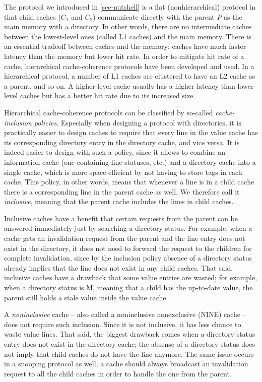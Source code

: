 The protocol we introduced in \autoref{sec-nutshell} is a flat (nonhierarchical) protocol in that child caches ($C_1$ and $C_2$) communicate directly with the parent $P$ as the main memory with a directory.
In other words, there are no intermediate caches between the lowest-level ones (called L1 caches) and the main memory.
There is an essential tradeoff between caches and the memory: caches have much faster latency than the memory but lower hit rate.
In order to mitigate hit rate of a cache, hierarchical cache-coherence protocols have been developed and used.
In a hierarchical protocol, a number of L1 caches are clustered to have an L2 cache as a parent, and so on.
A higher-level cache usually has a higher latency than lower-level caches but has a better hit rate due to its increased size.

Hierarchical cache-coherence protocols can be classified by so-called \emph{cache-inclusion policies}.
Especially when designing a protocol with directories, it is practically easier to design caches to require that every line in the value cache has its corresponding directory entry in the directory cache, and vice versa.
It is indeed easier to design with such a policy, since it allows to combine an information cache (one containing line statuses, etc.) and a directory cache into a single cache, which is more space-efficient by not having to store tags in each cache.
This policy, in other words, means that whenever a line is in a child cache there is a corresponding line in the parent cache as well.
We therefore call it \emph{inclusive}, meaning that the parent cache includes the lines in child caches.

Inclusive caches have a benefit that certain requests from the parent can be answered immediately just by searching a directory status.
For example, when a cache gets an invalidation request from the parent and the line entry does not exist in the directory, it does not need to forward the request to the children for complete invalidation, since by the inclusion policy absence of a directory status already implies that the line does not exist in any child caches.
That said, inclusive caches have a drawback that some value entries are wasted; for example, when a directory status is M, meaning that a child has the up-to-date value, the parent still holds a stale value inside the value cache.

A \emph{noninclusive} cache -- also called a noninclusive nonexclusive (NINE) cache -- does not require such inclusion.
Since it is not inclusive, it has less chance to waste value lines.
That said, the biggest drawback comes when a directory-status entry does not exist in the directory cache; the absense of a directory status does not imply that child caches do not have the line anymore.
The same issue occurs in a snooping protocol as well, \eg{} a cache should always broadcast an invalidation request to all the child caches in order to handle the one from the parent.

